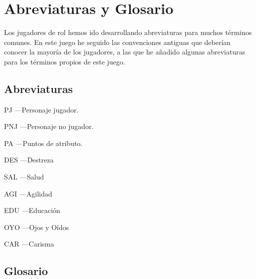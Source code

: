 \chapter{Abreviaturas y Glosario}

Los jugadores de rol hemos ido desarrollando abreviaturas para muchos términos comunes. En este juego he seguido las convenciones antiguas que deberían conocer la mayoría de los jugadores, a las que he añadido algunas abreviaturas para los términos propios de este juego.

\section{Abreviaturas}

\begin{description}
\small
\item{PJ} ---Personaje jugador.
\item{PNJ} ---Personaje no jugador.
\item{PA} ---Puntos de atributo.
\item{DES} ---Destreza
\item{SAL} ---Salud
\item{AGI} ---Agilidad
\item{EDU} ---Educación
\item{OYO} ---Ojos y Oídos
\item{CAR} ---Carisma
\end{description}

\section{Glosario}
